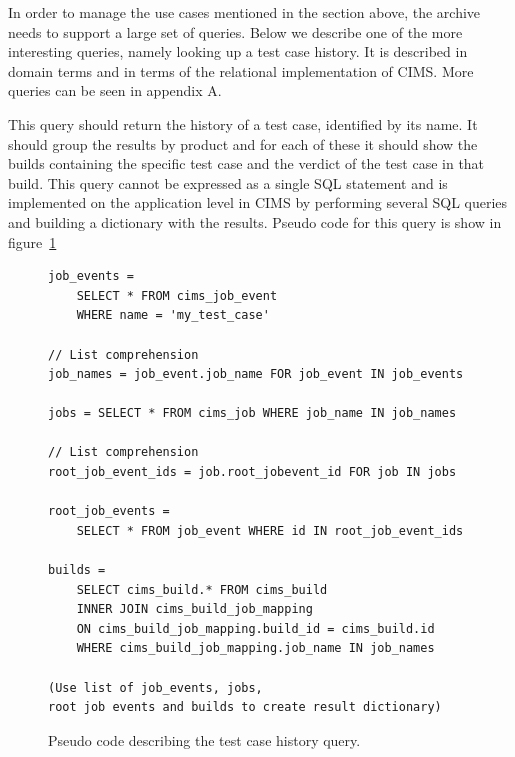 In order to manage the use cases mentioned in the section above, the archive needs to support a large set of queries. Below we describe one of the more interesting queries, namely looking up a test case history. It is described in domain terms and in terms of the relational implementation of CIMS. More queries can be seen in appendix A.


\label{q:tchistory}
This query should return the history of a test case, identified by its name. It should group the results by product and for each of these it should show the builds containing the specific test case and the verdict of the test case in that build. This query cannot be expressed as a single SQL statement and is implemented on the application level in CIMS by performing several SQL queries and building a dictionary with the results. Pseudo code for this query is show in figure~\ref{code:tc_history}

\begin{figure}[ht]
\begin{mdframed}
\begin{verbatim}
job_events = 
    SELECT * FROM cims_job_event 
    WHERE name = 'my_test_case'

// List comprehension
job_names = job_event.job_name FOR job_event IN job_events 

jobs = SELECT * FROM cims_job WHERE job_name IN job_names

// List comprehension
root_job_event_ids = job.root_jobevent_id FOR job IN jobs

root_job_events = 
    SELECT * FROM job_event WHERE id IN root_job_event_ids

builds = 
    SELECT cims_build.* FROM cims_build
    INNER JOIN cims_build_job_mapping
    ON cims_build_job_mapping.build_id = cims_build.id
    WHERE cims_build_job_mapping.job_name IN job_names

(Use list of job_events, jobs, 
root job events and builds to create result dictionary)
\end{verbatim}
\end{mdframed}
\caption{Pseudo code describing the test case history query.}
\label{code:tc_history}
\end{figure}


